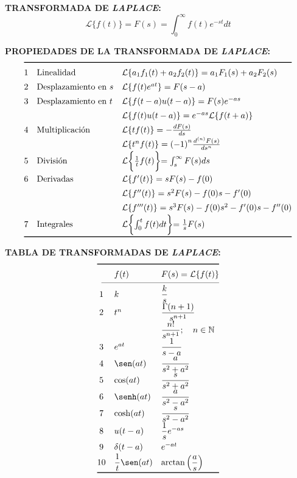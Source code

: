 \documentclass[letter,twoside,8pt]{article}
\begin{document}
\textbf{TRANSFORMADA DE \emph{LAPLACE}:}
\begin{equation*}
    \mathcal{L}\{f(t)\}=F(s)=\int_0^{\infty}f(t)e^{-st}{dt}
\end{equation*}

\textbf{PROPIEDADES DE LA TRANSFORMADA DE \emph{LAPLACE}:}
\begin{equation*}
\def\arraystretch{1.4}
\begin{array}{@{}cll@{}}
\toprule
 1 & \text{Linealidad}
   & \mathcal{L}\{a_1f_1(t)+a_2f_2(t)\}=a_1F_1(s)+a_2F_2(s)\\
 2 & \text{Desplazamiento en }s
   & \mathcal{L}\{f(t)e^{at}\}=F(s-a)\\
 3 & \text{Desplazamiento en }t
   & \mathcal{L}\{f(t-a)u(t-a)\}=F(s)e^{-as}\\
   &
   & \mathcal{L}\{f(t)u(t-a)\}=e^{-as}\mathcal{L}\{f(t+a)\}\\
 4 & \text{Multiplicación}
   & \mathcal{L}\{{t}f(t)\}=-\frac{dF(s)}{ds}\\
   &
   & \mathcal{L}\{t^{n}f(t)\}={(-1)}^n\frac{d^{(n)}F(s)}{ds^n}\\
 5 & \text{División}
   & \mathcal{L}\biggl\{\frac{1}{t}f(t)\biggl\}=\int_s^{\infty}F(s){ds}\\
 6 & \text{Derivadas}
   & \mathcal{L}\{f^{\prime}(t)\}=sF(s)-f(0)\\
   &
   & \mathcal{L}\{f^{\prime\prime}(t)\}=s^2F(s)-f(0)s-f^{\prime}(0)\\
   &
   & \mathcal{L}\{f^{\prime\prime\prime}(t)\}=s^3F(s)-f(0)s^2-f^{\prime}(0)s-f^{\prime\prime}(0)\\
 7 & \text{Integrales}
   & \mathcal{L}\biggl\{\int_0^{t}f(t){dt}\biggl\}=\frac{1}{s}F(s)\\
\bottomrule
\end{array}
\end{equation*}

\textbf{TABLA DE TRANSFORMADAS DE \emph{LAPLACE}:}
\begin{equation*}
\def\arraystretch{1.4}
\begin{array}{@{}cll@{}}
\toprule
 & f(t) & F(s)=\mathcal{L}\{f(t)\}\\
\cmidrule(l){1-3}
 1 & k
   & \dfrac{k}{s}\\
 2 & t^n
   & \dfrac{\Gamma(n+1)}{s^{n+1}}\\
   &
   & \dfrac{n!}{s^{n+1}};\quad{n}\in\mathbb{N}\\
 3 & e^{at}
   & \dfrac{1}{s-a}\\
 4 & \sen(at)
   & \dfrac{a}{s^2+a^2}\\
 5 & \cos(at)
   & \dfrac{s}{s^2+a^2}\\
 6 & \senh(at)
   & \dfrac{a}{s^2-a^2}\\
 7 & \cosh(at)
   & \dfrac{s}{s^2-a^2}\\
 8 & u(t-a)
   & \dfrac{1}{s}e^{-as}\\
 9 & \delta(t-a)
   & e^{-at}\\
10 & \dfrac{1}{t}\sen(at)
   & \arctan\left(\dfrac{a}{s}\right)\\
\bottomrule
\end{array}
\end{equation*}
\end{document}

